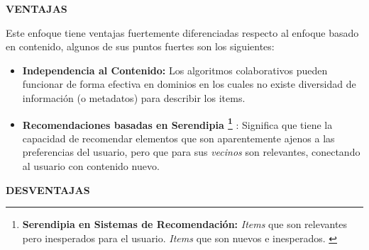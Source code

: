 \newpage

\textbf{VENTAJAS}

Este enfoque tiene ventajas fuertemente diferenciadas respecto al enfoque basado en contenido, algunos de sus puntos fuertes son los siguientes:

\begin{itemize}
    \item \textbf{Independencia al Contenido: } Los algoritmos colaborativos pueden funcionar de forma efectiva en dominios en los cuales no existe diversidad de información (o metadatos) para describir los items.
    \item \textbf{Recomendaciones basadas en Serendipia \footnote{\textbf{Serendipia en Sistemas de Recomendación: } \textit{Items} que son relevantes pero inesperados para el usuario. \textit{Items} que son nuevos e inesperados. \parencite{Kotkov2020Serendipity}} }: Significa que tiene la capacidad de recomendar elementos que son aparentemente ajenos a las preferencias del usuario, pero que para sus \textit{vecinos} son relevantes, conectando al usuario con contenido nuevo.
\end{itemize}

\textbf{DESVENTAJAS}

